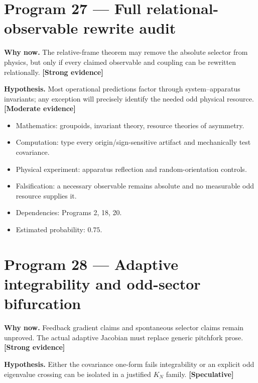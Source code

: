 \documentclass[11pt,a4paper,openany]{report}
\newcommand{\statusStrong}{\textcolor{finblue}{[Strong evidence]}}
\newcommand{\statusModerate}{\textcolor{finviolet}{[Moderate evidence]}}
\newcommand{\statusSpeculative}{\textcolor{finorange}{[Speculative]}}
\begin{document}
\section{Program 27 — Full relational-observable rewrite audit}

\textbf{Why now.} The relative-frame theorem may remove the absolute selector from physics, but only if every claimed observable and coupling can be rewritten relationally. \textbf{\statusStrong{}}

\textbf{Hypothesis.} Most operational predictions factor through system–apparatus invariants; any exception will precisely identify the needed odd physical resource. \textbf{\statusModerate{}}

\begin{itemize}
\item 
Mathematics: groupoids, invariant theory, resource theories of asymmetry.

\item 
Computation: type every origin/\allowbreak{}sign-sensitive artifact and mechanically test covariance.

\item 
Physical experiment: apparatus reflection and random-orientation controls.

\item 
Falsification: a necessary observable remains absolute and no measurable odd resource supplies it.

\item 
Dependencies: Programs 2, 18, 20.

\item 
Estimated probability: \(0.75\).

\end{itemize}

\section{Program 28 — Adaptive integrability and odd-sector bifurcation}

\textbf{Why now.} Feedback gradient claims and spontaneous selector claims remain unproved. The actual adaptive Jacobian must replace generic pitchfork prose. \textbf{\statusStrong{}}

\textbf{Hypothesis.} Either the covariance one-form fails integrability or an explicit odd eigenvalue crossing can be isolated in a justified \(K_N\) family. \textbf{\statusSpeculative{}}
\end{document}
